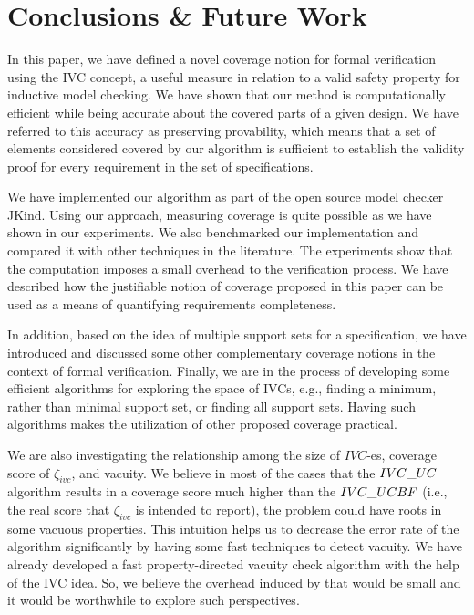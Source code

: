 \section{Conclusions \& Future Work}
\label{sec:conclusion}

In this paper, we have defined a novel coverage notion for formal verification using
the IVC concept, a useful measure in relation to
a valid safety property for inductive model checking. We have shown that our method
 is computationally efficient while
 being accurate about the covered parts of a given design.
 We have referred to this accuracy as preserving provability, which means
 that a set of elements considered covered by our algorithm is sufficient
 to establish the validity proof for every requirement in the set of specifications.

 We have implemented
our algorithm as part of the open source model checker JKind. Using our approach, measuring coverage is quite possible as we have shown in our experiments.
 We also benchmarked our implementation and compared it with other techniques in the literature.
 The experiments show that the computation imposes a small overhead to the verification process. We have described how the justifiable notion of coverage proposed in this paper can be used as a
means of quantifying requirements completeness.

 In addition, based on the idea of multiple support sets for a specification, we
 have introduced and discussed some other complementary coverage notions in the context of formal verification. Finally, we are in the process of developing some efficient algorithms for exploring the space of IVCs, e.g., finding a
minimum, rather than minimal support set, or finding all support sets. Having such algorithms makes the utilization of other proposed coverage practical.

We are also investigating the relationship among the size of $IVC$-es, coverage score of $\zeta_{ivc}$, and vacuity. We believe in most of the cases that the ${IVC\_UC}$ algorithm results in a coverage score much higher
than the ${IVC\_UCBF}$ (i.e., the real score that $\zeta_{ivc}$ is intended to report), the problem
could have roots in some vacuous properties. This intuition helps us to decrease the error rate of the \ucalg algorithm significantly by having some fast techniques to detect vacuity. We have already developed a  fast property-directed vacuity check
algorithm with the help of the IVC idea. So, we believe the overhead induced by that would be small and it would be worthwhile to explore such perspectives. 